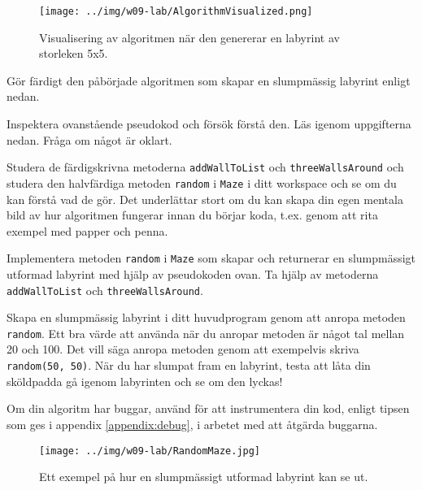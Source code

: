 \begin{figure}[H]
	\begin{center}
		\texttt{[image: ../img/w09-lab/AlgorithmVisualized.png]}
	\end{center}
	\caption{Visualisering av algoritmen när den genererar en labyrint av storleken 5x5.}
	\label{lab:maze:prims-algo-viz}
\end{figure}


\Task Gör färdigt den påbörjade algoritmen som skapar en slumpmässig labyrint enligt nedan.

\Subtask Inspektera ovanstående pseudokod och försök förstå den. Läs igenom uppgifterna nedan. Fråga om något är oklart. 

\Subtask Studera de färdigskrivna metoderna \texttt{addWallToList} och \texttt{threeWallsAround} och studera den halvfärdiga metoden \texttt{random} i \texttt{Maze} i ditt workspace och se om du kan förstå vad de gör. Det underlättar stort om du kan skapa din egen mentala bild av hur algoritmen fungerar innan du börjar koda, t.ex. genom att rita exempel med papper och penna.

\Subtask Implementera metoden \texttt{random} i \texttt{Maze} som skapar och returnerar en slumpmässigt utformad labyrint med hjälp av pseudokoden ovan. Ta hjälp av metoderna \texttt{addWallToList} och \texttt{threeWallsAround}.

\Subtask Skapa en slumpmässig labyrint i ditt huvudprogram genom att anropa metoden \texttt{random}. Ett bra värde att använda när du anropar metoden är något tal mellan 20 och 100. Det vill säga anropa metoden genom att exempelvis skriva \texttt{random(50, 50)}. När du har slumpat fram en labyrint, testa att låta din sköldpadda gå igenom labyrinten och se om den lyckas!

\Subtask Om din algoritm har buggar, använd  för att instrumentera din kod, enligt tipsen som ges i appendix \ref{appendix:debug}, i arbetet med att åtgärda buggarna.

\begin{figure}[h]
	\begin{center}
		\texttt{[image: ../img/w09-lab/RandomMaze.jpg]}
	\end{center}
	\caption{Ett exempel på hur en slumpmässigt utformad labyrint kan se ut.}
\end{figure}


